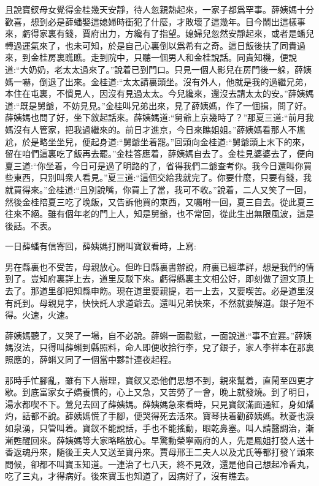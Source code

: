\begin{parag}
    且說寶釵母女覺得金桂幾天安靜，待人忽親熱起來，一家子都爲罕事。薛姨媽十分歡喜，想到必是薛蟠娶這媳婦時衝犯了什麼，才敗壞了這幾年。目今鬧出這樣事來，虧得家裏有錢，賈府出力，方纔有了指望。媳婦兒忽然安靜起來，或者是蟠兒轉過運氣來了，也未可知，於是自己心裏倒以爲希有之奇。這日飯後扶了同貴過來，到金桂房裏瞧瞧。走到院中，只聽一個男人和金桂說話。同貴知機，便說道:“大奶奶，老太太過來了。”說着已到門口。只見一個人影兒在房門後一躲，薛姨媽一嚇，倒退了出來。金桂道:“太太請裏頭坐。沒有外人，他就是我的過繼兄弟，本住在屯裏，不慣見人，因沒有見過太太。今兒纔來，還沒去請太太的安。”薛姨媽道:“既是舅爺，不妨見見。”金桂叫兄弟出來，見了薛姨媽，作了一個揖，問了好。薛姨媽也問了好，坐下敘起話來。薛姨媽道:“舅爺上京幾時了？”那夏三道:“前月我媽沒有人管家，把我過繼來的。前日才進京，今日來瞧姐姐。”薛姨媽看那人不尷尬，於是略坐坐兒，便起身道:“舅爺坐着罷。”回頭向金桂道:“舅爺頭上末下的來，留在咱們這裏吃了飯再去罷。”金桂答應着，薛姨媽自去了。金桂見婆婆去了，便向夏三道:“你坐着，今日可是過了明路的了，省得我們二爺查考你。我今日還叫你買些東西，只別叫衆人看見。”夏三道:“這個交給我就完了。你要什麼，只要有錢，我就買得來。”金桂道:“且別說嘴，你買上了當，我可不收。”說着，二人又笑了一回，然後金桂陪夏三吃了晚飯，又告訴他買的東西，又囑咐一回，夏三自去。從此夏三往來不絕。雖有個年老的門上人，知是舅爺，也不常回，從此生出無限風波，這是後話。不表。
\end{parag}


\begin{parag}
    一日薛蟠有信寄回，薛姨媽打開叫寶釵看時，上寫:
\end{parag}


\begin{qute2sp}
    男在縣裏也不受苦，母親放心。但昨日縣裏書辦說，府裏已經準詳，想是我們的情到了。豈知府裏詳上去，道里反駁下來。虧得縣裏主文相公好，即刻做了迴文頂上去了。那道里卻把知縣申飭。現在道里要親提，若一上去，又要喫苦。必是道里沒有託到。母親見字，快快託人求道爺去。還叫兄弟快來，不然就要解道。銀子短不得。火速，火速。
\end{qute2sp}


\begin{parag}
    薛姨媽聽了，又哭了一場，自不必說。薛蝌一面勸慰，一面說道:“事不宜遲。”薛姨媽沒法，只得叫薛蝌到縣照料，命人即便收拾行李，兌了銀子，家人李祥本在那裏照應的，薛蝌又同了一個當中夥計連夜起程。
\end{parag}


\begin{parag}
    那時手忙腳亂，雖有下人辦理，寶釵又恐他們思想不到，親來幫着，直鬧至四更才歇。到底富家女子嬌養慣的，心上又急，又苦勞了一會，晚上就發燒。到了明日，湯水都喫不下。鶯兒去回了薛姨媽。薛姨媽急來看時，只見寶釵滿面通紅，身如燔灼，話都不說。薛姨媽慌了手腳，便哭得死去活來。寶琴扶着勸薛姨媽。秋菱也淚如泉湧，只管叫着。寶釵不能說話，手也不能搖動，眼乾鼻塞。叫人請醫調治，漸漸甦醒回來。薛姨媽等大家略略放心。早驚動榮寧兩府的人，先是鳳姐打發人送十香返魂丹來，隨後王夫人又送至寶丹來。賈母邢王二夫人以及尤氏等都打發丫頭來問候，卻都不叫寶玉知道。一連治了七八天，終不見效，還是他自己想起冷香丸，吃了三丸，才得病好。後來寶玉也知道了，因病好了，沒有瞧去。
\end{parag}


